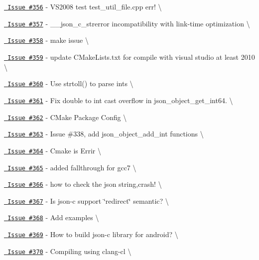 \begin{DoxyItemize}
\item \href{https://github.com/json-c/json-c/issues/356}{\texttt{ Issue \#356}} -\/ VS2008 test test\+\_\+util\+\_\+file.\+cpp err! \textbackslash{}
\item \href{https://github.com/json-c/json-c/issues/357}{\texttt{ Issue \#357}} -\/ \+\_\+\+\_\+json\+\_\+c\+\_\+strerror incompatibility with link-\/time optimization \textbackslash{}
\item \href{https://github.com/json-c/json-c/issues/358}{\texttt{ Issue \#358}} -\/ make issue \textbackslash{}
\item \href{https://github.com/json-c/json-c/issues/359}{\texttt{ Issue \#359}} -\/ update CMake\+Lists.\+txt for compile with visual studio at least 2010 \textbackslash{}
\item \href{https://github.com/json-c/json-c/issues/360}{\texttt{ Issue \#360}} -\/ Use strtoll() to parse ints \textbackslash{}
\item \href{https://github.com/json-c/json-c/issues/361}{\texttt{ Issue \#361}} -\/ Fix double to int cast overflow in json\+\_\+object\+\_\+get\+\_\+int64. \textbackslash{}
\item \href{https://github.com/json-c/json-c/issues/362}{\texttt{ Issue \#362}} -\/ CMake Package Config \textbackslash{}
\item \href{https://github.com/json-c/json-c/issues/363}{\texttt{ Issue \#363}} -\/ Issue \#338, add json\+\_\+object\+\_\+add\+\_\+int functions \textbackslash{}
\item \href{https://github.com/json-c/json-c/issues/364}{\texttt{ Issue \#364}} -\/ Cmake is Errir \textbackslash{}
\item \href{https://github.com/json-c/json-c/issues/365}{\texttt{ Issue \#365}} -\/ added fallthrough for gcc7 \textbackslash{}
\item \href{https://github.com/json-c/json-c/issues/366}{\texttt{ Issue \#366}} -\/ how to check the json string,crash! \textbackslash{}
\item \href{https://github.com/json-c/json-c/issues/367}{\texttt{ Issue \#367}} -\/ Is json-\/c support \char`\"{}redirect\char`\"{} semantic? \textbackslash{}
\item \href{https://github.com/json-c/json-c/issues/368}{\texttt{ Issue \#368}} -\/ Add examples \textbackslash{}
\item \href{https://github.com/json-c/json-c/issues/369}{\texttt{ Issue \#369}} -\/ How to build json-\/c library for android? \textbackslash{}
\item \href{https://github.com/json-c/json-c/issues/370}{\texttt{ Issue \#370}} -\/ Compiling using clang-\/cl \textbackslash{}

\end{DoxyItemize}
